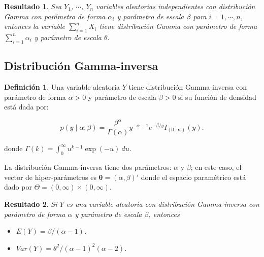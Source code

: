 \documentclass[
  10pt,
  spanish,
]{book}
\providecommand{\tightlist}{%
  \setlength{\itemsep}{0pt}\setlength{\parskip}{0pt}}
\newtheorem{proposition}{Resultado}[chapter]
\theoremstyle{definition}
\newtheorem{definition}{Definición}[chapter]
\theoremstyle{definition}
\theoremstyle{definition}
\theoremstyle{definition}
\theoremstyle{remark}
\begin{document}
\begin{proposition}
\protect\hypertarget{prp:unnamed-chunk-24}{}{\label{prp:unnamed-chunk-24} }Sea \(Y_1\), \(\cdots\), \(Y_n\) variables aleatorias independientes con distribución Gamma con parámetro de forma \(\alpha_i\) y parámetro de escala \(\beta\) para \(i=1,\cdots,n\), entonces la variable \(\sum_{i=1}^nX_i\) tiene distribución Gamma con parámetro de forma \(\sum_{i=1}^n\alpha_i\) y parámetro de escala \(\theta\).
\end{proposition}

\hypertarget{distribuciuxf3n-gamma-inversa}{%
\subsection{Distribución Gamma-inversa}\label{distribuciuxf3n-gamma-inversa}}

\begin{definition}
\protect\hypertarget{def:unnamed-chunk-25}{}{\label{def:unnamed-chunk-25} }Una variable aleatoria \(Y\) tiene distribución Gamma-inversa con parámetro de forma \(\alpha>0\) y parámetro de escala \(\beta>0\) si su función de densidad está dada por:

\begin{equation}
p(y \mid \alpha,\beta)=\frac{\beta^\alpha}{\Gamma(\alpha)}y^{-\alpha-1} e^{-\beta/y}I_{(0,\infty)}(y).
\end{equation}

donde \(\Gamma(k)=\int_0^{\infty}u^{k-1}\exp(-u)\ du\).
\end{definition}

La distribución Gamma-inversa tiene dos parámetros: \(\alpha\) y \(\beta\); en este caso, el vector de hiper-parámetros es \(\boldsymbol \theta=(\alpha,\beta)'\) donde el espacio paramétrico está dado por \(\Theta=(0,\infty)\times(0,\infty)\).

\begin{proposition}
\protect\hypertarget{prp:unnamed-chunk-26}{}{\label{prp:unnamed-chunk-26} }Si \(Y\) es una variable aleatoria con distribución Gamma-inversa con parámetro de forma \(\alpha\) y parámetro de escala \(\beta\), entonces

\begin{itemize}
\tightlist
\item
  \(E(Y)=\beta/(\alpha-1)\).
\item
  \(Var(Y)=\theta^2/(\alpha-1)^2(\alpha-2)\).
\end{itemize}
\end{proposition}
\end{document}
